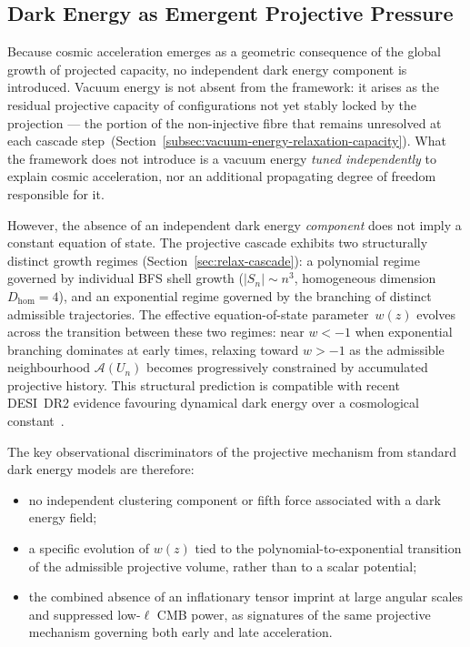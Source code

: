 \subsection{Dark Energy as Emergent Projective Pressure}
  \label{subsec:absence-of-dark-energy-signatures}

  Because cosmic acceleration emerges as a geometric consequence of the
  global growth of projected capacity, no independent dark energy component is introduced.
  Vacuum energy is not absent from the framework: it arises as the residual
  projective capacity of configurations not yet stably locked by the projection ---
  the portion of the non-injective fibre that remains unresolved at each cascade
  step~(Section~\ref{subsec:vacuum-energy-relaxation-capacity}).
  What the framework does not introduce is a vacuum energy \emph{tuned independently}
  to explain cosmic acceleration, nor an additional propagating degree of freedom
  responsible for it.

  However, the absence of an independent dark energy \emph{component} does not
  imply a constant equation of state.
  The projective cascade exhibits two structurally distinct growth regimes
  (Section~\ref{sec:relax-cascade}): a polynomial regime governed by individual BFS
  shell growth ($|S_n| \sim n^3$, homogeneous dimension $D_{\mathrm{hom}} = 4$), and
  an exponential regime governed by the branching of distinct admissible trajectories.
  The effective equation-of-state parameter~$w(z)$ evolves across the transition
  between these two regimes: near $w < -1$ when exponential branching dominates at
  early times, relaxing toward $w > -1$ as the admissible neighbourhood
  $\mathcal{A}(U_n)$ becomes progressively constrained by accumulated projective
  history.
  This structural prediction is compatible with recent DESI~DR2 evidence
  favouring dynamical dark energy over a cosmological
  constant~\cite{DESI2025}.

  The key observational discriminators of the projective mechanism from
  standard dark energy models are therefore:
  \begin{itemize}
    \item no independent clustering component or fifth force associated with a
    dark energy field;
    \item a specific evolution of $w(z)$ tied to the polynomial-to-exponential
    transition of the admissible projective volume, rather than to a scalar potential;
    \item the combined absence of an inflationary tensor imprint at large angular
    scales and suppressed low-$\ell$ CMB power, as signatures of the same projective
    mechanism governing both early and late acceleration.
  \end{itemize}
